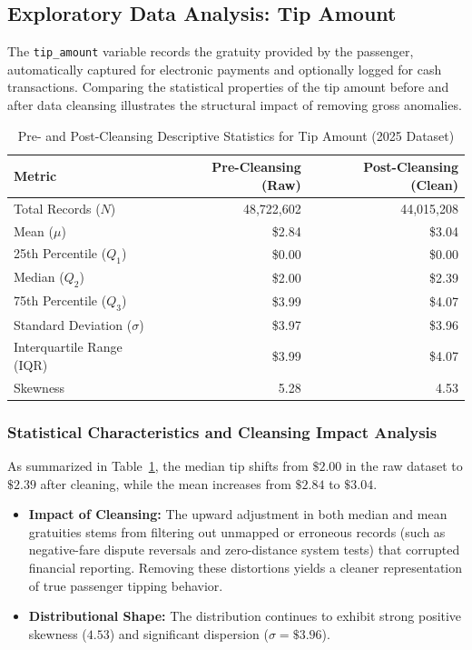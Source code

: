 \documentclass[11pt,a4paper]{article}
\begin{document}
\subsection{Exploratory Data Analysis: Tip Amount}
\label{sec:eda_tip_amount}

The \texttt{tip\_amount} variable records the gratuity provided by the passenger, automatically captured for electronic payments and optionally logged for cash transactions. Comparing the statistical properties of the tip amount before and after data cleansing illustrates the structural impact of removing gross anomalies.

\begin{table}[htbp]
\centering
\caption{Pre- and Post-Cleansing Descriptive Statistics for Tip Amount (2025 Dataset)}
\label{tab:stats_tip_amount_comparison}
\small
\begin{tabular}{lrr}
\toprule
\textbf{Metric} & \textbf{Pre-Cleansing (Raw)} & \textbf{Post-Cleansing (Clean)} \\
\midrule
Total Records ($N$) & 48,722,602 & 44,015,208 \\
Mean ($\mu$) & \$2.84 & \$3.04 \\
25th Percentile ($Q_1$) & \$0.00 & \$0.00 \\
Median ($Q_2$) & \$2.00 & \$2.39 \\
75th Percentile ($Q_3$) & \$3.99 & \$4.07 \\
Standard Deviation ($\sigma$) & \$3.97 & \$3.96 \\
Interquartile Range (IQR) & \$3.99 & \$4.07 \\
Skewness & 5.28 & 4.53 \\
\bottomrule
\end{tabular}
\end{table}

\subsubsection{Statistical Characteristics and Cleansing Impact Analysis}
As summarized in Table~\ref{tab:stats_tip_amount_comparison}, the median tip shifts from $\$2.00$ in the raw dataset to $\$2.39$ after cleaning, while the mean increases from $\$2.84$ to $\$3.04$. 
\begin{itemize}
    \item \textbf{Impact of Cleansing:} The upward adjustment in both median and mean gratuities stems from filtering out unmapped or erroneous records (such as negative-fare dispute reversals and zero-distance system tests) that corrupted financial reporting. Removing these distortions yields a cleaner representation of true passenger tipping behavior.
    \item \textbf{Distributional Shape:} The distribution continues to exhibit strong positive skewness ($4.53$) and significant dispersion ($\sigma = \$3.96$).
\end{itemize}
\end{document}
